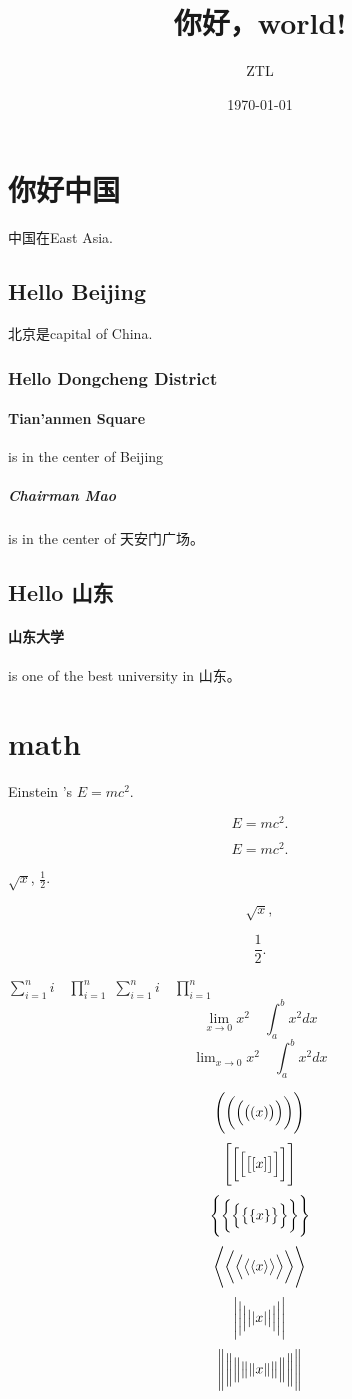 \documentclass[UTF8]{ctexart}
\title{你好，world!}
\author{ZTL}
\date{\today}
\begin{document}
\tableofcontents
\maketitle

\section{你好中国}
中国在East Asia.
\subsection{Hello Beijing}
北京是capital of China.
\subsubsection{Hello Dongcheng District}
\paragraph{Tian'anmen Square}
is in the center of Beijing
\subparagraph{Chairman Mao}
is in the center of 天安门广场。
\subsection{Hello 山东}
\paragraph{山东大学} is one of the best university in 山东。

\section{math}
Einstein 's $E=mc^2$.

\[ E=mc^2. \]

\begin{equation}
E=mc^2.
\end{equation}

$\sqrt{x}$, $\frac{1}{2}$.

\[ \sqrt{x}, \]

\[ \frac{1}{2}. \]

$ \sum_{i=1}^n i\quad \prod_{i=1}^n $
$ \sum\limits _{i=1}^n i\quad \prod\limits _{i=1}^n $
\[ \lim_{x\to0}x^2 \quad \int_a^b x^2 dx \]
\[ \lim\nolimits _{x\to0}x^2\quad \int\nolimits_a^b x^2 dx \]

\[ \Biggl(\biggl(\Bigl(\bigl((x)\bigr)\Bigr)\biggr)\Biggr) \]
\[ \Biggl[\biggl[\Bigl[\bigl[[x]\bigr]\Bigr]\biggr]\Biggr] \]
\[ \Biggl \{\biggl \{\Bigl \{\bigl \{\{x\}\bigr \}\Bigr \}\biggr \}\Biggr\} \]
\[ \Biggl\langle\biggl\langle\Bigl\langle\bigl\langle\langle x
\rangle\bigr\rangle\Bigr\rangle\biggr\rangle\Biggr\rangle \]
\[ \Biggl\lvert\biggl\lvert\Bigl\lvert\bigl\lvert\lvert x
\rvert\bigr\rvert\Bigr\rvert\biggr\rvert\Biggr\rvert \]
\[ \Biggl\lVert\biggl\lVert\Bigl\lVert\bigl\lVert\lVert x
\rVert\bigr\rVert\Bigr\rVert\biggr\rVert\Biggr\rVert \]
\end{document}
